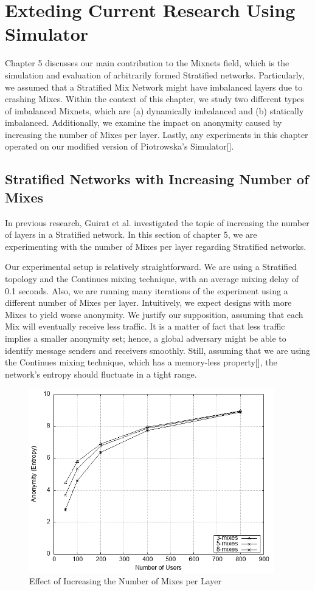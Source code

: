 \documentclass[logo,msc,cyber]{infthesis}   %
\begin{document}
\chapter{Exteding Current Research Using Simulator}
Chapter 5 discusses our main contribution to the Mixnets field, which is the
simulation and evaluation of arbitrarily formed Stratified networks.
Particularly, we assumed that a Stratified Mix Network might have imbalanced
layers due to crashing Mixes. Within the context of this chapter, we study two
different types of imbalanced Mixnets, which are (a) dynamically imbalanced and
(b) statically imbalanced. Additionally, we examine the impact on anonymity
caused by increasing the number of Mixes per layer. Lastly, any experiments in
this chapter operated on our modified version of Piotrowska's Simulator[].

\section{Stratified Networks with Increasing Number of Mixes}

In previous research, Guirat et al. investigated the topic of increasing the
number of layers in a Stratified network. In this section of chapter 5, we are
experimenting with the number of Mixes per layer regarding Stratified networks.

Our experimental setup is relatively straightforward. We are using a Stratified
topology and the Continues mixing technique, with an average mixing delay of 0.1
seconds. Also, we are running many iterations of the experiment using a
different number of Mixes per layer. Intuitively, we expect designs with more
Mixes to yield worse anonymity. We justify our supposition, assuming that each
Mix will eventually receive less traffic. It is a matter of fact that less
traffic implies a smaller anonymity set; hence, a global adversary might be able
to identify message senders and receivers smoothly. Still, assuming that we are
using the Continues mixing technique, which has a memory-less property[], the
network's entropy should fluctuate in a tight range.

\begin{figure}[h!]
    \centering
    \includegraphics[height=8cm]{figures/simulator_extentions/compare_layer_size.png}
    \caption{Effect of Increasing the Number of Mixes per Layer}
    \label{fig:stratified-incresing-number-of-mixes}
\end{figure}    
\end{document}
